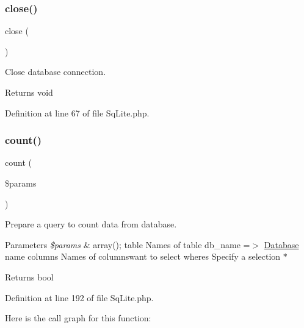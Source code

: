 \subsubsection{\texorpdfstring{close()}{close()}}
{\footnotesize\ttfamily close (\begin{DoxyParamCaption}{ }\end{DoxyParamCaption})}

Close database connection.

\begin{DoxyReturn}{Returns}
void 
\end{DoxyReturn}


Definition at line 67 of file Sq\+Lite.\+php.

\mbox{\label{class_zest_1_1_database_1_1_drives_1_1_sq_lite_1_1_sq_lite_a47d80aeef2e59da428db2507a28a34ac}} 
\subsubsection{\texorpdfstring{count()}{count()}}
{\footnotesize\ttfamily count (\begin{DoxyParamCaption}\item[{}]{\$params }\end{DoxyParamCaption})}

Prepare a query to count data from database.


\begin{DoxyParams}{Parameters}
{\em \$params} & array(); \textquotesingle{}table\textquotesingle{} Names of table \textquotesingle{}db\+\_\+name\textquotesingle{} =$>$ \mbox{\hyperlink{namespace_zest_1_1_database}{Database}} name \textquotesingle{}columns\textquotesingle{} Names of columnswant to select \textquotesingle{}wheres\textquotesingle{} Specify a selection $\ast$\\
\hline
\end{DoxyParams}
\begin{DoxyReturn}{Returns}
bool 
\end{DoxyReturn}


Definition at line 192 of file Sq\+Lite.\+php.

Here is the call graph for this function\+:
\mbox{\label{class_zest_1_1_database_1_1_drives_1_1_sq_lite_1_1_sq_lite_adfcacab70ff8275177a010598e68b186}} 
